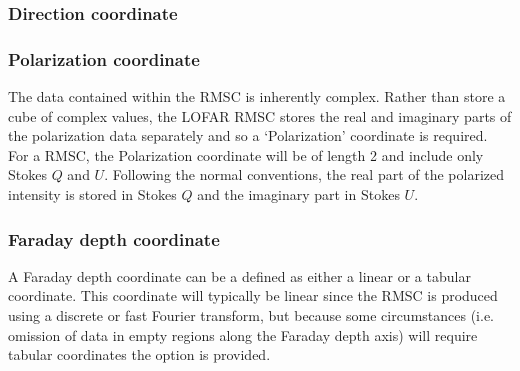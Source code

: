 \documentclass[a4paper,10pt,bibtotoc]{scrartcl}
\begin{document}
\subsubsection{Direction coordinate}
\label{sec:coord-direction}



\subsubsection{Polarization coordinate}
\label{sec:coord-polarization}
	
The data contained within the RMSC is inherently complex.  Rather than store a cube of complex values, the LOFAR RMSC stores the real and imaginary parts of the polarization data separately and so a `Polarization' coordinate is required.  For a RMSC, the Polarization coordinate will be of length 2 and include only Stokes $Q$ and $U$.  Following the normal conventions, the real part of the polarized intensity is stored in Stokes $Q$ and the imaginary part in Stokes $U$.



\subsubsection{Faraday depth coordinate}
\label{sec:fd_coordinate}

A Faraday depth coordinate can be a defined as either a linear or a tabular coordinate. This coordinate will typically be linear since the RMSC is produced using a discrete or fast Fourier transform, but because some circumstances (i.e. omission of data in empty regions along the Faraday depth axis) will require tabular coordinates the option is provided.  
\end{document}

